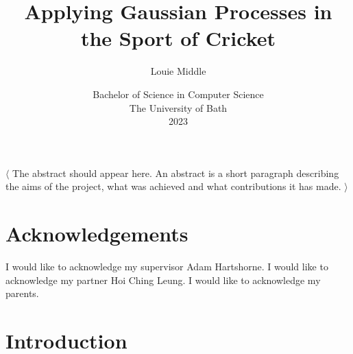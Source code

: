 \documentclass[12pt,a4paper]{report}
\title{\bf Applying Gaussian Processes in the Sport of Cricket}
\author{Louie Middle}
\date{Bachelor of Science in Computer Science\\ 
      The University of Bath\\
      2023}
\theoremstyle{definition}
\begin{document}
\hypersetup{pageanchor=false}	

\lstset{language=Java,breaklines,breakatwhitespace,basicstyle=\small}

\setcounter{page}{0}

\maketitle
\newpage

\newpage

\newpage

\hypersetup{pageanchor=true}

\abstract
$\langle$
The abstract should appear here. 
An abstract is a short paragraph describing the aims of the project, what was achieved and what contributions it has made.
$\rangle$
\newpage

\tableofcontents
\newpage

\listoffigures
\newpage

\listoftables
\newpage

\listofalgorithms
\newpage

\chapter*{Acknowledgements}

I would like to acknowledge my supervisor Adam Hartshorne.
I would like to acknowledge my partner Hoi Ching Leung.
I would like to acknowledge my parents.

\newpage
\setcounter{page}{1}

\chapter{Introduction}
\end{document}

